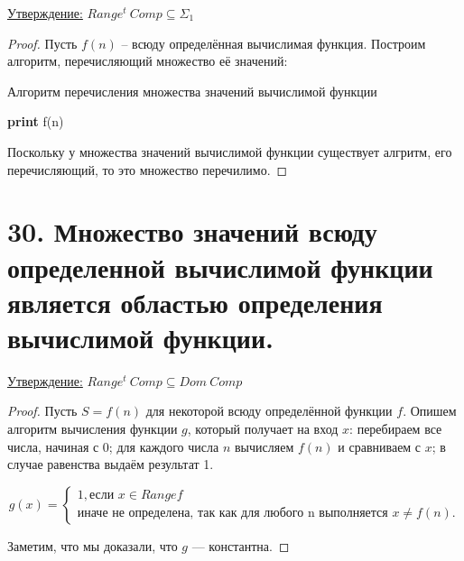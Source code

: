 \documentclass[a4paper, 12pt]{article}
\newcommand{\statement}{\underline{Утверждение:} }
\begin{document}
\statement{$Range^t\ Comp \subseteq \Sigma_1$}
        
        \begin{proof}
            Пусть $f(n)$ -- всюду определённая вычислимая функция. Построим алгоритм, перечисляющий множество её значений:
            
            \begin{algorithm}
            \caption{Алгоритм перечисления множества значений вычислимой функции}
            \begin{algorithmic}[1]
                    \State \textbf{print} f(n)
                \EndFor
            \EndFunction
            \end{algorithmic}
            \end{algorithm}
            
            Поскольку у множества значений вычислимой функции существует алгритм, его перечисляющий, то это множество перечилимо.
            
        \end{proof}

\section*{30. Множество значений всюду определенной вычислимой функции является областью определения вычислимой функции.}

\statement{$Range^t\ Comp \subseteq Dom\ Comp$}
        
        \begin{proof}
            Пусть $S = f(n)$ для некоторой всюду определённой функции $f$. Опишем алгоритм вычисления функции $g$, который получает на вход $x$: перебираем все числа, начиная с 0; для каждого числа $n$ вычисляем $f(n)$ и сравниваем с $x$; в случае равенства выдаём результат 1.
            
             \[
                g(x) =
                \begin{cases}
                    1, \text{если $x \in Rangef$} \\
                    \text{иначе не определена, так как для любого n выполняется $x \neq f(n)$}.
                \end{cases}
            \]
            
        Заметим, что мы доказали, что $g$ --- константна.
        \end{proof}
\end{document}
